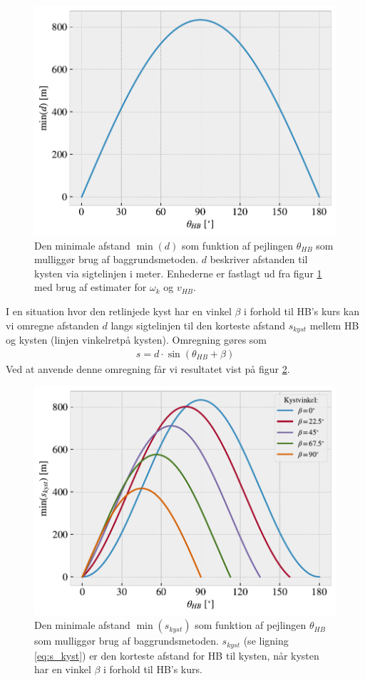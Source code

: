 \documentclass[%
 reprint,
nofootinbib,
aps,
]{revtex4-1}
\begin{document}
\begin{figure}[H]
  \includegraphics[width=\linewidth]{figures/limit_dimension.pdf}
  \caption{Den minimale afstand $\min{(d)}$ som funktion af pejlingen $\theta_{HB}$ som mulliggør brug af baggrundsmetoden. $d$ beskriver afstanden til kysten via sigtelinjen i meter. Enhederne er fastlagt ud fra figur \ref{fig:limit_dimension} med brug af estimater for $\omega_k$ og $v_{HB}$.}
  \label{fig:limit_dimension}
\end{figure}
I en situation hvor den retlinjede kyst har en vinkel $\beta$ i forhold til HB's kurs kan vi omregne afstanden $d$ langs sigtelinjen til den korteste afstand $s_{kyst}$ mellem HB og kysten (linjen vinkelretpå kysten). Omregning gøres som
\begin{align}
  s = d\cdot \sin{(\theta_{HB} + \beta)}
  \label{eq:s_kyst}
\end{align}
Ved at anvende denne omregning får vi resultatet vist på figur \ref{fig:limit_coastdis}.
\begin{figure}[H]
  \includegraphics[width=\linewidth]{figures/limit_coastdis.pdf}
  \caption{Den minimale afstand $\min{(s_{kyst})}$ som funktion af pejlingen $\theta_{HB}$ som mulliggør brug af baggrundsmetoden. $s_{kyst}$ (se ligning \ref{eq:s_kyst}) er den korteste afstand for HB til kysten, når kysten har en vinkel $\beta$ i forhold til HB's kurs.}
  \label{fig:limit_coastdis}
\end{figure}
\end{document}
